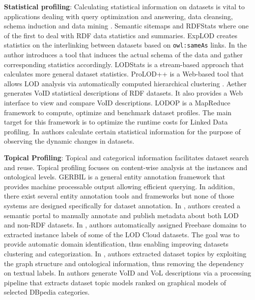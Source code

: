 \documentclass[runningheads,a4paper]{llncs}
\begin{document}
\textbf{Statistical profiling}: Calculating statistical information on datasets is vital to applications dealing with query optimization and answering, data cleansing, schema induction and data mining \cite{profilingWebOfData} \cite{datafinland2} \cite{6690016}. Semantic sitemaps \cite{Cyganiak:2008:SSE:1789394.1789457} and RDFStats \cite{Langegger:2009:RER:1674635.1674691} where one of the first to deal with RDF data statistics and summaries. ExpLOD \cite{Khatchadourian:2010:ESE:2155278.2155300} creates statistics on the interlinking between datasets based on \texttt{owl:sameAs} links. In \cite{semwebprofiling} the author introduces a tool that induces the actual schema of the data and gather corresponding statistics accordingly. LODStats  \cite{Auer:2012:LEF:2413941.2413982} is a stream-based approach that calculates more general dataset statistics. ProLOD++ \cite{6816740} is a Web-based tool that allows LOD analysis via automatically computed hierarchical clustering \cite{5452762}. Aether \cite{makela-aether-2014} generates VoID statistical descriptions of RDF datasets. It also provides a Web interface to view and compare VoID descriptions. LODOP \cite{forchhammer_profiles_2014} is a MapReduce framework to compute, optimize and benchmark dataset profiles. The main target for this framework is to optimize the runtime costs for Linked Data profiling. In \cite{DyLDO} authors calculate certain statistical information for the purpose of observing the dynamic changes in datasets.

\textbf{Topical Profiling}: Topical and categorical information facilitates dataset search and reuse. Topical profiling focuses on content-wise analysis at the instances and ontological levels. GERBIL \cite{gerbil} is a general entity annotation framework that provides machine processable output allowing efficient querying. In addition, there exist several entity annotation tools and frameworks \cite{Cornolti:2013:FBE:2488388.2488411} but none of those systems are designed specifically for dataset annotation. In \cite{datafinalnd}, authors created a semantic portal to manually annotate and publish metadata about both LOD and non-RDF datasets. In \cite{6690016}, authors automatically assigned Freebase domains to extracted instance labels of some of the LOD Cloud datasets. The goal was to provide automatic domain identification, thus enabling improving datasets clustering and categorization. In \cite{Bohm:2012:LTG:2396761.2398718}, authors extracted dataset topics by exploiting the graph structure and ontological information, thus removing the dependency on textual labels. In  \cite{scalableApproach} authors generate VoID and VoL descriptions via a processing pipeline that extracts dataset topic models ranked on graphical models of selected DBpedia categories.
\end{document}
